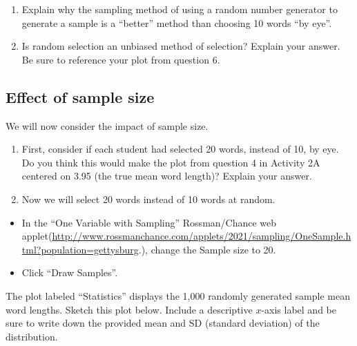 \documentclass[
]{report}
\begin{document}
\newpage

\begin{enumerate}
\def\labelenumi{\arabic{enumi}.}
\setcounter{enumi}{7}
\item
  Explain why the sampling method of using a random number generator to generate a sample is a ``better'' method than choosing 10 words ``by eye''.
  \vspace{0.8in}
\item
  Is random selection an unbiased method of selection? Explain your answer. Be sure to reference your plot from question 6.
  \vspace{0.5in}
\end{enumerate}

\hypertarget{effect-of-sample-size}{%
\subsection*{Effect of sample size}\label{effect-of-sample-size}}

We will now consider the impact of sample size.

\begin{enumerate}
\def\labelenumi{\arabic{enumi}.}
\setcounter{enumi}{9}
\item
  First, consider if each student had selected 20 words, instead of 10, by eye. Do you think this would make the plot from question 4 in Activity 2A centered on 3.95 (the true mean word length)? Explain your answer.
  \vspace{0.4in}
\item
  Now we will select 20 words instead of 10 words at random.
\end{enumerate}

\begin{itemize}
\item
  In the ``One Variable with Sampling'' Rossman/Chance web applet(\url{http://www.rossmanchance.com/applets/2021/sampling/OneSample.html?population=gettysburg}.), change the Sample size to 20.
\item
  Click ``Draw Samples''.
\end{itemize}

The plot labeled ``Statistics'' displays the 1,000 randomly generated sample mean word lengths. Sketch this plot below. Include a descriptive \(x\)-axis label and be sure to write down the provided mean and SD (standard deviation) of the distribution.
\vspace{1.6in}
\end{document}
